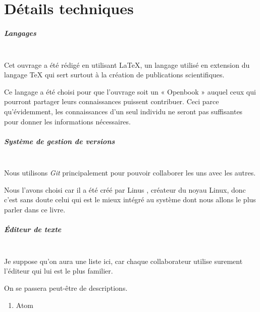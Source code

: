 \chapter*{Détails techniques}

\paragraph{Langages} ~\\

Cet ouvrage a été rédigé en utilisant \LaTeX{}, un langage utilisé en extension
du langage \TeX{} qui sert surtout à la création de publications scientifiques.

Ce langage a été choisi pour que l'ouvrage soit un « Openbook » auquel
ceux qui pourront partager leurs connaissances puissent contribuer. Ceci parce
qu'évidemment, les connaissances d'un seul individu ne seront pas suffisantes
pour donner les informations nécessaires.

\paragraph{Système de gestion de versions} ~\\

Nous utilisons \emph{Git} principalement pour pouvoir collaborer les uns avec
les autres.

Nous l'avons choisi car il a été créé par Linus , créateur du
noyau Linux, donc c'est sans doute celui qui est le mieux intégré au système
dont nous allons le plus parler dans ce livre.

\paragraph{Éditeur de texte} ~\\

Je suppose qu'on aura une liste ici, car chaque collaborateur utilise surement
l'éditeur qui lui est le plus familier.

On se passera peut-être de descriptions.

\begin{enumerate}
  \item Atom
\end{enumerate}
